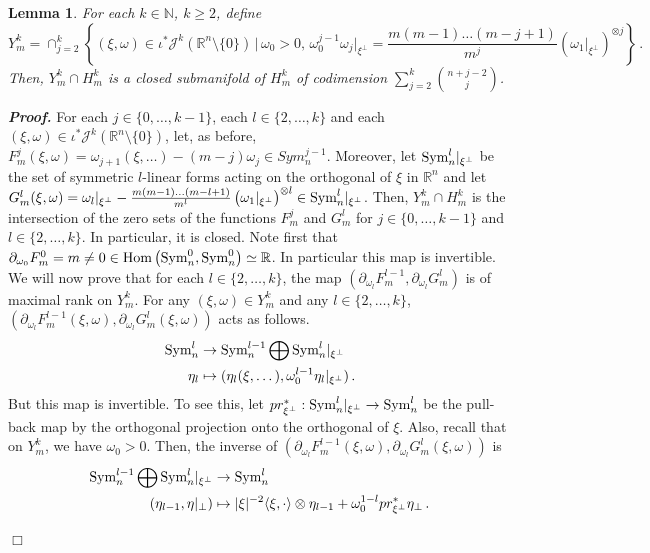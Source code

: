 \documentclass[10pt,twoside]{article}
\newcommand{\R}{\mathbb{R}}
\newcommand{\N}{\mathbb{N}}
\newcommand{\calJ}{\mathcal{J}}
\newcommand{\Rnzls}{\mathbb{R}^n\setminus\{0\}}
\newcommand{\Sym}{\textup{Sym}}
\newenvironment{prf}[1][]
{\vskip 2mm  {\it \bf Proof#1. }}{$\Box$ \vskip 2mm}
\numberwithin{theorem}{section}
\newtheorem{lemma}[theorem]{Lemma}
\begin{document}
\begin{lemma}\label{l.jet_equations}
For each $k\in\N$, $k\geq 2$, define
\[
Y^k_m = \cap_{j=2}^k\left\{(\xi,\omega)\in\iota^*\calJ^k\left(\Rnzls\right)\, \Big |\, \omega_0>0,\,  \omega_0^{j-1}\omega_j|_{\xi^\perp}=\frac{m(m-1)\dots(m-j+1)}{m^j}\left(\omega_1|_{\xi^\perp}\right)^{\otimes j}\right\}\, .
\]
Then, $Y^k_m\cap H^k_m$ is a closed submanifold of $H^k_m$ of codimension $\sum_{j=2}^k\binom{n+j-2}{j}$.
\end{lemma}
\begin{prf}
For each $j\in\{0,\dots,k-1\}$, each $l\in\{2,\dots,k\}$ and each $(\xi,\omega)\in\iota^*\calJ^k\left(\Rnzls\right)$, let, as before, $F_m^j(\xi,\omega)=\omega_{j+1}(\xi,\dots)-(m-j)\omega_j\in Sym_n^{j-1}$. Moreover, let $\Sym_n^l|_{\xi^\perp}$ be the set of symmetric $l$-linear forms acting on the orthogonal of $\xi$ in $\R^n$ and let $G_m^l(\xi,\omega)=\omega_l|_{\xi^\perp}-\frac{m(m-1)\dots(m-l+1)}{m^l}\left(\omega_1|_{\xi^\perp}\right)^{\otimes l}\in \Sym_n^l|_{\xi^\perp}$. Then, $Y_m^k\cap H_m^k$ is the intersection of the zero sets of the functions $F_m^j$ and $G_m^l$ for $j\in\{0,\dots,k-1\}$ and $l\in\{2,\dots,k\}$. In particular, it is closed. Note first that $\partial_{\omega_0}F_m^0=m\neq 0\in\textup{Hom}\left(\Sym_n^0,\Sym_n^0\right)\simeq\R$. In particular this map is invertible. We will now prove that for each $l\in\{2,\dots,k\}$, the map $(\partial_{\omega_l} F_m^{l-1},\partial_{\omega_l} G_m^l)$ is of maximal rank on $Y^k_m$. For any $(\xi,\omega)\in Y^k_m$ and any $l\in\{2,\dots,k\}$, $(\partial_{\omega_l}F_m^{l-1}(\xi,\omega),\partial_{\omega_l}G_m^l(\xi,\omega))$ acts as follows.
\begin{align*}
\Sym_n^l&\rightarrow \Sym_n^{l-1}\bigoplus\Sym_n^l|_{\xi^\perp}\\
\eta_l&\mapsto(\eta_l(\xi,\dots),\omega_0^{l-1}\eta_l|_{\xi^\perp})\, .
\end{align*}
But this map is invertible. To see this, let $pr_{\xi^\perp}^*:\Sym_n^l|_{\xi^\perp}\rightarrow\Sym_n^l$ be the pull-back map by the orthogonal projection onto the orthogonal of $\xi$. Also, recall that on $Y^k_m$, we have $\omega_0>0$. Then, the inverse of $(\partial_{\omega_l}F_m^{l-1}(\xi,\omega),\partial_{\omega_l}G_m^l(\xi,\omega))$ is
\begin{align*}
 \Sym_n^{l-1}\bigoplus\Sym_n^l|_{\xi^\perp}&\rightarrow\Sym_n^l\\
(\eta_{l-1},\eta|_{\perp})&\mapsto |\xi|^{-2}\langle \xi,\cdot\rangle\otimes\eta_{l-1}+\omega_0^{1-l}pr_{\xi^\perp}^*\eta_\perp\, .
\end{align*}

\end{prf}
\end{document}
